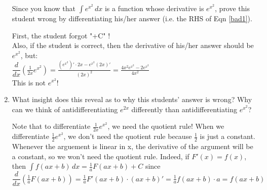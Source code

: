 \documentclass[noinstructornotes]{ximera}
\begin{document}
\begin{problem}
\begin{enumerate}
Since you know that $\int e^{x^2} \, dx$ is a function whose derivative is $e^{x^2}$, prove this student wrong by differentiating his/her answer (i.e. the RHS of Eqn \ref{bad1}).  
	\begin{freeResponse}
	First, the student forgot "+C" ! \\
	Also, if the student is correct, then the derivative of his/her answer should be $e^{x^2}$, but:\\
	$\dfrac{d}{dx} \left( \frac{1}{2x} e^{x^2} \right) = \frac{\left(e^{x^2}\right)' \cdot 2x - e^{x^2} \left( 2x \right)'}{\left( 2x \right)^2} = 
	\frac{4x^2e^{x^2} - 2e^{x^2}}{4x^2}$ \\
	This is not $e^{x^2}$!
	\end{freeResponse}
		
	\item 	What insight does this reveal as to why this students' answer is wrong?  Why can we think of antidifferentiating $e^{2x}$ differently than antidifferentiating $e^{x^2}$?
		
			\begin{freeResponse}
			Note that to differentiate $ \frac{1}{2x} e^{x^2} $, we need the quotient rule!  When we differentiate $ \frac{1}{2} e^{x^2}$, we don't need the quotient rule because $\frac{1}{2}$ is just a constant. \\
			Whenever the arguement is linear in x, the derivative of the argument will be a constant, so we won't need the quotient rule.  Indeed, if $F'(x) = f(x)$, then $\int f(ax+b) \, dx = \frac{1}{a}F(ax+b) + C$ since \\ 
			$\dfrac{d}{dx} \left( \frac{1}{a} F(ax+b) \right) = \frac{1}{a} F'(ax+b) \cdot (ax+b)' = \frac{1}{a}f(ax+b) \cdot a = f(ax+b)$
			\end{freeResponse}
	\end{enumerate}
		
		
\end{problem}
\end{document}
